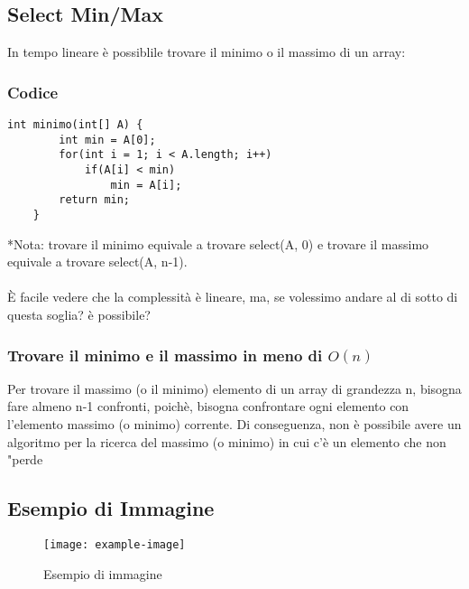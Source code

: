 \documentclass[a4paper,12pt]{article}
\begin{document}
\subsection{Select Min/Max}
In tempo lineare è possiblile trovare il minimo o il massimo di un array:
\subsubsection{\textcolor{codice}{Codice}}
\begin{lstlisting}[style=mystyle]
    int minimo(int[] A) {
        int min = A[0];
        for(int i = 1; i < A.length; i++) 
            if(A[i] < min) 
                min = A[i];
        return min;
    }
\end{lstlisting}
{\small{*Nota: trovare il minimo equivale a trovare select(A, 0) e trovare il massimo equivale a trovare select(A, n-1).}} \\ \\
È facile vedere che la complessità è lineare, ma, se volessimo andare al di sotto di questa soglia? è possibile? \\

\subsubsection{Trovare il minimo e il massimo in meno di $O(n)$}
Per trovare il massimo (o il minimo) elemento di un array di grandezza n, bisogna fare almeno n-1 confronti, poichè, bisogna confrontare 
ogni elemento con l'elemento massimo (o minimo) corrente.  Di conseguenza, non è possibile avere un algoritmo per la ricerca del massimo (o minimo) 
in cui c'è un elemento che non "perde



\subsection{Esempio di Immagine}
\begin{figure}[h]
    \centering
    \texttt{[image: example-image]}
    \caption{Esempio di immagine}
\end{figure}
\end{document}

